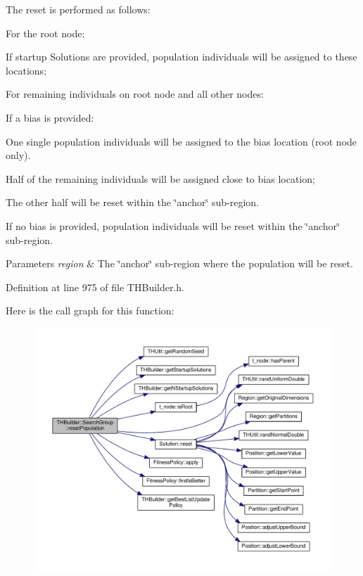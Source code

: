 The reset is performed as follows\+:
\begin{DoxyItemize}
\item For the root node\+:
\begin{DoxyItemize}
\item If startup Solutions are provided, population individuals will be assigned to these locations;
\end{DoxyItemize}
\item For remaining individuals on root node and all other nodes\+:
\begin{DoxyItemize}
\item If a bias is provided\+:
\begin{DoxyItemize}
\item One single population individuals will be assigned to the bias location (root node only).
\item Half of the remaining individuals will be assigned close to bias location;
\item The other half will be reset within the \char`\"{}anchor\char`\"{} sub-\/region.
\end{DoxyItemize}
\item If no bias is provided, population individuals will be reset within the \char`\"{}anchor\char`\"{} sub-\/region.
\end{DoxyItemize}
\end{DoxyItemize}


\begin{DoxyParams}{Parameters}
{\em region} & The \char`\"{}anchor\char`\"{} sub-\/region where the population will be reset. \\
\hline
\end{DoxyParams}


Definition at line 975 of file T\+H\+Builder.\+h.



Here is the call graph for this function\+:
\nopagebreak
\begin{figure}[H]
\begin{center}
\leavevmode
\includegraphics[width=350pt]{classTHBuilder_1_1SearchGroup_aafebb836a1ec681213319a024a254ca8_cgraph}
\end{center}
\end{figure}





